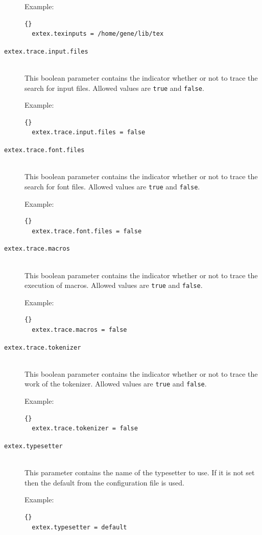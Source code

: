 \documentclass{extex-doc}
\makeatletter
\newcommand\Property[1]{\texttt{#1}\index{#1@\texttt{#1}}}
\makeatother
\begin{document}
\begin{description}
  Example:
\begin{lstlisting}{}
  extex.texinputs = /home/gene/lib/tex
\end{lstlisting}

\item[\Property{extex.trace.input.files}]\ \\
  This boolean parameter contains the indicator whether or not to
  trace the search for input files.  Allowed values are \verb|true|
  and \verb|false|.

  Example:
\begin{lstlisting}{}
  extex.trace.input.files = false
\end{lstlisting}

\item[\Property{extex.trace.font.files}]\ \\
  This boolean parameter contains the indicator whether or not to
  trace the search for font files.  Allowed values are \verb|true| and
  \verb|false|.


  Example:
\begin{lstlisting}{}
  extex.trace.font.files = false
\end{lstlisting}

\item[\Property{extex.trace.macros}]\ \\
  This boolean parameter contains the indicator whether or not to
  trace the execution of macros.  Allowed values are \verb|true| and
  \verb|false|.

  Example:
\begin{lstlisting}{}
  extex.trace.macros = false
\end{lstlisting}

\item[\Property{extex.trace.tokenizer}]\ \\
  This boolean parameter contains the indicator whether or not to
  trace the work of the tokenizer.  Allowed values are \verb|true| and
  \verb|false|.

  Example:
\begin{lstlisting}{}
  extex.trace.tokenizer = false
\end{lstlisting}

\item[\Property{extex.typesetter}]\ \\
  This parameter contains the name of the typesetter to use. If it is
  not set then the default from the configuration file is used.

  Example:
\begin{lstlisting}{}
  extex.typesetter = default
\end{lstlisting}

\end{description}
\end{document}
